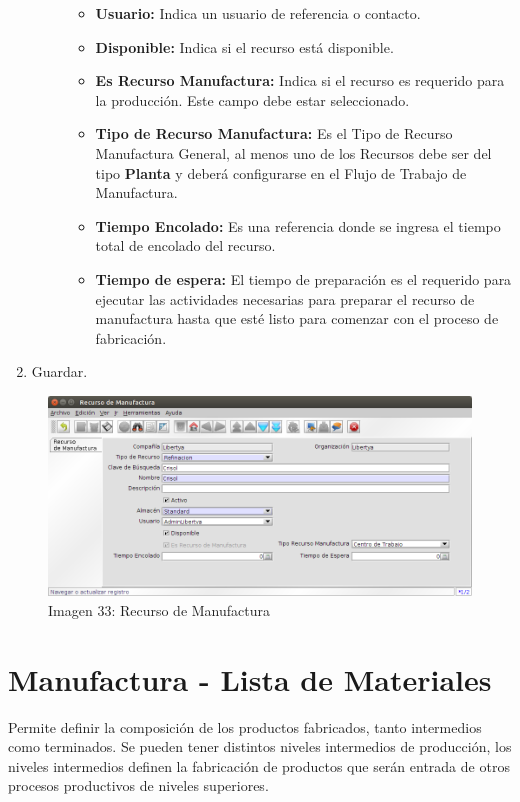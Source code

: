 \documentclass[letterpaper,10pt,spanish]{sphinxmanual}
\begin{document}
\begin{enumerate}
\begin{description}
\begin{itemize}
\item {} 
\textbf{Usuario:} Indica un usuario de referencia o contacto.

\item {} 
\textbf{Disponible:} Indica si el recurso está disponible.

\item {} 
\textbf{Es Recurso Manufactura:} Indica si el recurso es requerido para la producción. Este campo debe estar seleccionado.

\item {} 
\textbf{Tipo de Recurso Manufactura:} Es el Tipo de Recurso Manufactura General, al menos uno de los Recursos debe ser del tipo \textbf{Planta} y deberá configurarse en el Flujo de Trabajo de Manufactura.

\item {} 
\textbf{Tiempo Encolado:} Es una referencia donde se ingresa el tiempo total de encolado del recurso.

\item {} 
\textbf{Tiempo de espera:} El tiempo de preparación es el requerido para ejecutar las actividades necesarias para preparar el recurso de manufactura hasta que esté listo para comenzar con el proceso de fabricación.

\end{itemize}

\end{description}

\item {} 
Guardar.

\end{enumerate}
\begin{figure}[htbp]
\centering
\capstart

\includegraphics{ly_recurso.png}
\caption{Imagen 33: Recurso de Manufactura}\end{figure}


\section{Manufactura - Lista de Materiales}
\label{manufactura-bom:manufactura-lista-de-materiales}\label{manufactura-bom::doc}
Permite definir la composición de los productos fabricados, tanto intermedios como  terminados. Se pueden tener distintos niveles intermedios de producción, los  niveles intermedios definen la fabricación de productos que serán entrada de otros procesos productivos de niveles superiores.
\end{document}
